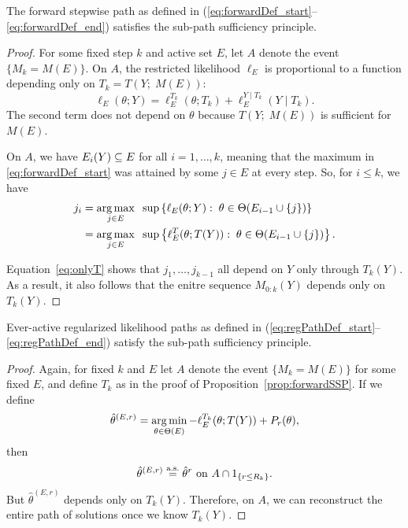 \documentclass{article}
\begin{document}
\begin{proposition}\label{prop:forwardSSP}
  The forward stepwise path as defined in
  (\ref{eq:forwardDef_start}--\ref{eq:forwardDef_end}) satisfies the 
  sub-path sufficiency principle.
\end{proposition}
\begin{proof}
  For some fixed step $k$ and active set $E$, 
  let $A$ denote the event $\{M_k = M(E)\}$. 
  On $A$, the restricted likelihood $\ell_E$ is proportional to a
  function depending only on $T_k = T(Y; \;M(E))$:
  \[
  \ell_E(\theta; Y) = \ell_E^{T_k}(\theta; T_k) 
  + \ell_E^{Y \mid T_k}(Y \mid T_k).
  \]
  The second term does not depend on $\theta$ 
  because $T(Y; \;M(E))$ is sufficient for $M(E)$.

  On $A$, we have $E_i(Y) \subseteq E$ for all $i=1,\ldots, k$, meaning   that the maximum in \eqref{eq:forwardDef_start} was attained by some $j\in E$ at every step. So, for $i \leq k$, we have
\begin{align}
  j_i &= \operatorname*{arg\,max}_{j\in E} \;\;\sup \left\{\ell_E(\theta; Y):\;
    \theta\in\Theta(E_{i-1} \cup \{j\})\right\} \\
  &= \operatorname*{arg\,max}_{j\in E} \;\;\sup \left\{\ell_E^T(\theta; T(Y)):\;
    \theta\in\Theta(E_{i-1} \cup \{j\})\right\}. \label{eq:onlyT}
\end{align}

Equation~\eqref{eq:onlyT} shows that $j_1,\ldots, j_{k-1}$ all depend on $Y$ only through $T_k(Y)$. As a result, it also follows that the enitre sequence $M_{0:k}(Y)$ depends only on $T_k(Y)$.
\end{proof}

\begin{proposition}\label{prop:regPathSSP}
Ever-active regularized likelihood paths as defined in 
(\ref{eq:regPathDef_start}--\ref{eq:regPathDef_end}) satisfy the
sub-path sufficiency principle.
\end{proposition}

\begin{proof}
  Again, for fixed $k$ and $E$ let $A$ denote the event $\{M_k = M(E)\}$ for some fixed $E$, and define $T_k$ as in the proof of Proposition~\ref{prop:forwardSSP}. If we define
\[
\hat\theta^{(E,r)} = \operatorname*{arg\,min}_{\theta\in\Theta(E)} -\ell_E^{T_k}(\theta; T(Y)) + P_r(\theta),
\]
then 
\[
\hat\theta^{(E,r)} \overset{\textrm{a.s.}}{=} \hat\theta^{r} \text{ on } 
A \cap 1_{\{r \leq R_k\}}.
\]
But $\hat\theta^{(E,r)}$ depends only on $T_k(Y)$. Therefore, on $A$, we can reconstruct the entire path of solutions once we know $T_k(Y)$.
\end{proof}
\end{document}
